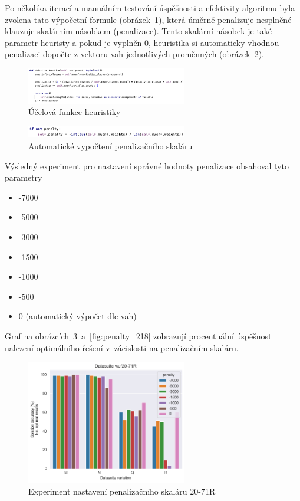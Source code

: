\documentclass[twoside,twocolumn]{article}
\begin{document}
    Po několika iterací a manuálním testování úspěšnosti a efektivity algoritmu byla zvolena tato výpočetní formule (obrázek~\ref{fig:objective}),
    která úměrně penalizuje nesplněné klauzuje skalárním násobkem (penalizace).
    Tento skalární násobek je také parametr heuristy a pokud je vyplněn 0, heuristika si automaticky vhodnou penalizaci
    dopočte z vektoru vah jednotlivých proměnných (obrázek~\ref{fig:auto_penalty}).

    \begin{figure}
        \centering
        \includegraphics[width=7cm]{images/objective}
        \caption{Účelová funkce heuristiky}
        \label{fig:objective}
    \end{figure}

    \begin{figure}
        \centering
        \includegraphics[width=7cm]{images/auto_penalty}
        \caption{Automatické vypočtení penalizačního skaláru}
        \label{fig:auto_penalty}
    \end{figure}

    Výsledný experiment pro nastavení správné hodnoty penalizace obsahoval tyto parametry

    \begin{itemize}
        \item -7000
        \item -5000
        \item -3000
        \item -1500
        \item -1000
        \item -500
        \item 0 (automatický výpočet dle vah)
    \end{itemize}

    Graf na obrázcích~\ref{fig:penalty_71}~a~\ref{fig:penalty_218} zobrazují procentuální úspěšnost nalezení optimálního řešení
    v~zácislosti na penalizačním skaláru.

    \begin{figure}
        \centering
        \includegraphics[width=7cm]{images/testing/penalty/wuf20-71R}
        \caption{Experiment nastavení penalizačního skaláru 20-71R}
        \label{fig:penalty_71}
    \end{figure}
\end{document}
